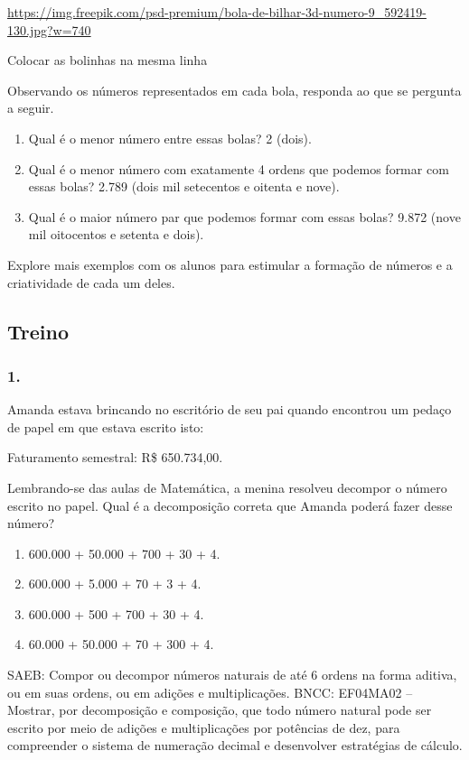 \begin{enumerate}
\url{https://img.freepik.com/psd-premium/bola-de-bilhar-3d-numero-9_592419-130.jpg?w=740}

Colocar as bolinhas na mesma linha

Observando os números representados em cada bola, responda ao que se pergunta a seguir.

\begin{enumerate}
\def\labelenumi{\alph{enumi})}
\item
  Qual é o menor número entre essas bolas?
  2 (dois).
\item
  Qual é o menor número com exatamente 4 ordens que podemos formar com essas bolas?
  2.789 (dois mil setecentos e oitenta e nove).
\item
  Qual é o maior número par que podemos formar com essas bolas?
  9.872 (nove mil oitocentos e setenta e dois).
\end{enumerate}

Explore mais exemplos com os alunos para estimular a formação de números
e a criatividade de cada um deles.

\subsection{Treino}\label{treino}

\subsubsection{1.}\label{section-10}

Amanda estava brincando no escritório de seu pai quando encontrou um
pedaço de papel em que estava escrito isto:

Faturamento semestral: R\$ 650.734,00.

Lembrando-se das aulas de Matemática, a menina resolveu decompor o número escrito
no papel. Qual é a decomposição correta que Amanda poderá fazer desse
número?

\begin{enumerate}
\def\labelenumi{\alph{enumi})}
\item
  600.000 + 50.000 + 700 + 30 + 4.
\item
  600.000 + 5.000 + 70 + 3 + 4.
\item
  600.000 + 500 + 700 + 30 + 4.
\item
  60.000 + 50.000 + 70 + 300 + 4.
\end{enumerate}

SAEB: Compor ou decompor números naturais de até 6 ordens na forma aditiva, ou em suas ordens, ou em adições e multiplicações.
BNCC: EF04MA02 -- Mostrar, por decomposição e composição, que todo número natural pode ser escrito
por meio de adições e multiplicações por potências de dez, para compreender o sistema de
numeração decimal e desenvolver estratégias de cálculo.


\end{enumerate}
